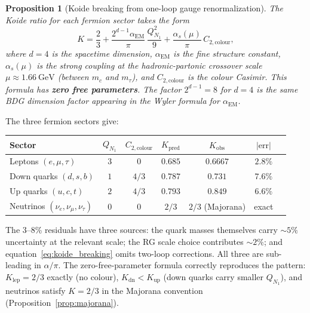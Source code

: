 \documentclass[11pt,a4paper]{article}
\newtheorem{proposition}[theorem]{Proposition}
\begin{document}
\begin{proposition}[Koide breaking from one-loop gauge renormalization]
\label{prop:koide_breaking}
The Koide ratio for each fermion sector takes the form
\begin{equation}
  K = \frac{2}{3}
  + \frac{2^{d-1}\alpha_{\mathrm{EM}}}{\pi}\,\frac{Q_{N_1}^2}{9}
  + \frac{\alpha_s(\mu)}{\pi}\,C_{2,\mathrm{colour}},
  \label{eq:koide_breaking}
\end{equation}
where $d = 4$ is the spacetime dimension, $\alpha_{\mathrm{EM}}$ is the
fine structure constant, $\alpha_s(\mu)$ is the strong coupling at the
hadronic-partonic crossover scale $\mu \approx 1.66~\mathrm{GeV}$
(between $m_c$ and $m_\tau$), and $C_{2,\mathrm{colour}}$ is the colour
Casimir. This formula has \textbf{zero free parameters}. The factor
$2^{d-1} = 8$ for $d=4$ is the same BDG dimension factor appearing in the
Wyler formula for $\alpha_{\mathrm{EM}}$.
\end{proposition}

The three fermion sectors give:
\begin{center}
\renewcommand{\arraystretch}{1.3}
\begin{tabular}{lcccccc}
\toprule
Sector & $Q_{N_1}$ & $C_{2,\mathrm{colour}}$ & $K_{\mathrm{pred}}$
       & $K_{\mathrm{obs}}$ & $|\mathrm{err}|$ \\
\midrule
Leptons $(e,\mu,\tau)$ & $3$ & $0$ & $0.685$ & $0.6667$ & $2.8\%$ \\
Down quarks $(d,s,b)$  & $1$ & $4/3$ & $0.787$ & $0.731$ & $7.6\%$ \\
Up quarks $(u,c,t)$    & $2$ & $4/3$ & $0.793$ & $0.849$ & $6.6\%$ \\
Neutrinos $(\nu_e,\nu_\mu,\nu_\tau)$ & $0$ & $0$ & $2/3$ & $2/3$ (Majorana) & exact \\
\bottomrule
\end{tabular}
\end{center}

The 3--8\% residuals have three sources: the quark masses themselves carry
$\sim 5\%$ uncertainty at the relevant scale; the RG scale choice contributes
$\sim 2\%$; and equation~\eqref{eq:koide_breaking} omits two-loop corrections.
All three are sub-leading in $\alpha/\pi$. The zero-free-parameter formula
correctly reproduces the pattern: $K_{\mathrm{lep}} = 2/3$ exactly (no
colour), $K_{\mathrm{dn}} < K_{\mathrm{up}}$ (down quarks carry smaller
$Q_{N_1}$), and neutrinos satisfy $K = 2/3$ in the Majorana convention
(Proposition~\ref{prop:majorana}).
\end{document}
